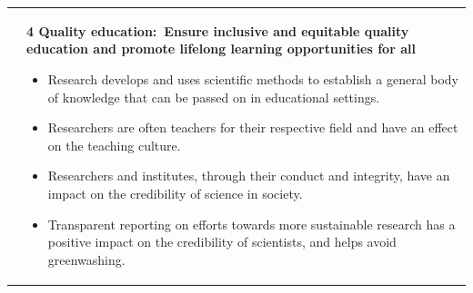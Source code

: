 \documentclass[../SustainableHEP.tex]{subfiles}
\begin{document}
\begin{longtable*}{l l}
\parbox[t]{\SDGleft\textwidth}{} & \parbox[t]{\SDGright\textwidth}{\textbf{4 Quality education:\ Ensure inclusive and equitable quality education and promote lifelong learning opportunities for all}
\begin{itemize}[leftmargin=20pt]
\item Research develops and uses scientific methods to establish a general body of knowledge that can be passed on in educational settings.
\item Researchers are often teachers for their respective field and have an effect on the teaching culture.
\item Researchers and institutes, through their conduct and integrity, have an impact on the credibility of science in society.
\item Transparent reporting on efforts towards more sustainable research has a positive impact on the credibility of scientists, and helps avoid greenwashing.
\end{itemize}}\\


\end{longtable*}
\end{document}
